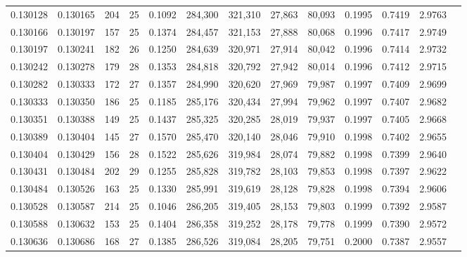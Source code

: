 \begin{tabular}{rrrrrrrrrrrrr}
0.130128 & 0.130165 & 204 &  25 &                                     0.1092 & 284,300 & 321,310 &  27,863 &  80,093 & 0.1995 & 0.7419 & 2.9763 \\
0.130166 & 0.130197 & 157 &  25 &                                     0.1374 & 284,457 & 321,153 &  27,888 &  80,068 & 0.1996 & 0.7417 & 2.9749 \\
0.130197 & 0.130241 & 182 &  26 &                                     0.1250 & 284,639 & 320,971 &  27,914 &  80,042 & 0.1996 & 0.7414 & 2.9732 \\
0.130242 & 0.130278 & 179 &  28 &                                     0.1353 & 284,818 & 320,792 &  27,942 &  80,014 & 0.1996 & 0.7412 & 2.9715 \\
0.130282 & 0.130333 & 172 &  27 &                                     0.1357 & 284,990 & 320,620 &  27,969 &  79,987 & 0.1997 & 0.7409 & 2.9699 \\
0.130333 & 0.130350 & 186 &  25 &                                     0.1185 & 285,176 & 320,434 &  27,994 &  79,962 & 0.1997 & 0.7407 & 2.9682 \\
0.130351 & 0.130388 & 149 &  25 &                                     0.1437 & 285,325 & 320,285 &  28,019 &  79,937 & 0.1997 & 0.7405 & 2.9668 \\
0.130389 & 0.130404 & 145 &  27 &                                     0.1570 & 285,470 & 320,140 &  28,046 &  79,910 & 0.1998 & 0.7402 & 2.9655 \\
0.130404 & 0.130429 & 156 &  28 &                                     0.1522 & 285,626 & 319,984 &  28,074 &  79,882 & 0.1998 & 0.7399 & 2.9640 \\
0.130431 & 0.130484 & 202 &  29 &                                     0.1255 & 285,828 & 319,782 &  28,103 &  79,853 & 0.1998 & 0.7397 & 2.9622 \\
0.130484 & 0.130526 & 163 &  25 &                                     0.1330 & 285,991 & 319,619 &  28,128 &  79,828 & 0.1998 & 0.7394 & 2.9606 \\
0.130528 & 0.130587 & 214 &  25 &                                     0.1046 & 286,205 & 319,405 &  28,153 &  79,803 & 0.1999 & 0.7392 & 2.9587 \\
0.130588 & 0.130632 & 153 &  25 &                                     0.1404 & 286,358 & 319,252 &  28,178 &  79,778 & 0.1999 & 0.7390 & 2.9572 \\
0.130636 & 0.130686 & 168 &  27 &                                     0.1385 & 286,526 & 319,084 &  28,205 &  79,751 & 0.2000 & 0.7387 & 2.9557 \\

\end{tabular}
